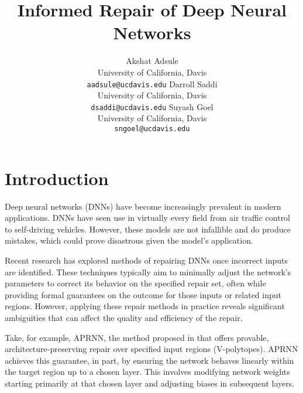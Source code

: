 \documentclass{article}
\title{Informed Repair of Deep Neural Networks}
\begin{document}
\author{
    Akshat Adsule \\
    University of California, Davis \\
    \texttt{aadsule@ucdavis.edu}
    \And
    Darroll Saddi \\
    University of California, Davis \\
    \texttt{dsaddi@ucdavis.edu}
    \And
    Suyash Goel \\
    University of California, Davis \\
    \texttt{sngoel@ucdavis.edu}
}

\maketitle


\section{Introduction}

Deep neural networks (DNNs) have become increasingly prevalent in modern applications.
DNNs have seen use in virtually every field from air traffic control to self-driving vehicles.
However, these models are not infallible and do produce mistakes, which could prove disastrous given the model's application.

Recent research \cite{nawas_provable_2024, sotoudeh_provable_2021, tao_architecture-preserving_2023} has explored methods of repairing DNNs once incorrect inputs are identified.
These techniques typically aim to minimally adjust the network's parameters to correct its behavior on the specified repair set, often while providing formal guarantees on the outcome for those inputs or related input regions.
However, applying these repair methods in practice reveals significant ambiguities that can affect the quality and efficiency of the repair.

Take, for example, APRNN, the method proposed in \cite{tao_architecture-preserving_2023} that offers provable, architecture-preserving repair over specified input regions (V-polytopes).
APRNN achieves this guarantee, in part, by ensuring the network behaves linearly within the target region up to a chosen layer.
This involves modifying network weights starting primarily at that chosen layer and adjusting biases in subsequent layers.
\end{document}
